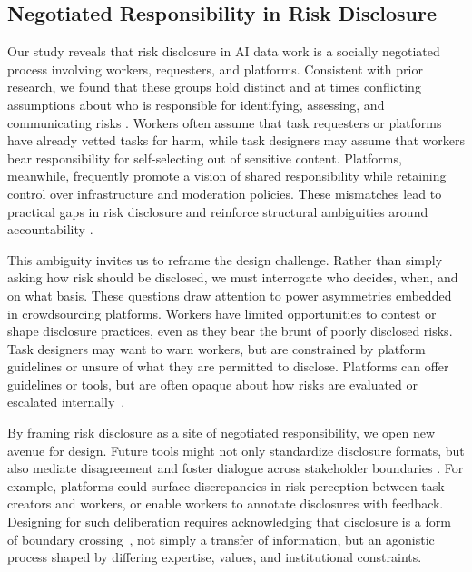 \subsection{Negotiated Responsibility in Risk Disclosure}
Our study reveals that risk disclosure in AI data work is a socially negotiated process involving workers, requesters, and platforms. Consistent with prior research, we found that these groups hold distinct and at times conflicting assumptions about who is responsible for identifying, assessing, and communicating risks \cite{fieseler_unfairness_2019}. Workers often assume that task requesters or platforms have already vetted tasks for harm, while task designers may assume that workers bear responsibility for self-selecting out of sensitive content. Platforms, meanwhile, frequently promote a vision of shared responsibility while retaining control over infrastructure and moderation policies. These mismatches lead to practical gaps in risk disclosure and reinforce structural ambiguities around accountability \cite{Suchman2002LocatedAccountabilities, widder_dislocated_2023}.


This ambiguity invites us to reframe the design challenge. Rather than simply asking how risk should be disclosed, we must interrogate who decides, when, and on what basis. These questions draw attention to power asymmetries embedded in crowdsourcing platforms. Workers have limited opportunities to contest or shape disclosure practices, even as they bear the brunt of poorly disclosed risks. Task designers may want to warn workers, but are constrained by platform guidelines or unsure of what they are permitted to disclose. Platforms can offer guidelines or tools, but are often opaque about how risks are evaluated or escalated internally~\cite{roberts2019behind}.

By framing risk disclosure as a site of negotiated responsibility, we open new avenue for design. Future tools might not only standardize disclosure formats, but also mediate disagreement and foster dialogue across stakeholder boundaries \cite{fieseler_unfairness_2019}. For example, platforms could surface discrepancies in risk perception between task creators and workers, or enable workers to annotate disclosures with feedback. Designing for such deliberation requires acknowledging that disclosure is a form of boundary crossing~\cite{Suchman2002LocatedAccountabilities}, not simply a transfer of information, but an agonistic process shaped by differing expertise, values, and institutional constraints.

